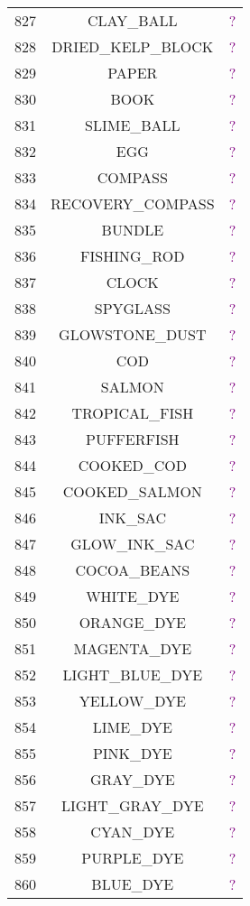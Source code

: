 \documentclass[11pt]{article}
\newcommand\myworries[1]{\textcolor{purple}{#1}}
\begin{document}
\begin{longtable}{ |c|c|c| }
	827 & CLAY\_BALL & \myworries{?} \\
	828 & DRIED\_KELP\_BLOCK & \myworries{?} \\
	829 & PAPER & \myworries{?} \\
	830 & BOOK & \myworries{?} \\
	831 & SLIME\_BALL & \myworries{?} \\
	832 & EGG & \myworries{?} \\
	833 & COMPASS & \myworries{?} \\
	834 & RECOVERY\_COMPASS & \myworries{?} \\
	835 & BUNDLE & \myworries{?} \\
	836 & FISHING\_ROD & \myworries{?} \\
	837 & CLOCK & \myworries{?} \\
	838 & SPYGLASS & \myworries{?} \\
	839 & GLOWSTONE\_DUST & \myworries{?} \\
	840 & COD & \myworries{?} \\
	841 & SALMON & \myworries{?} \\
	842 & TROPICAL\_FISH & \myworries{?} \\
	843 & PUFFERFISH & \myworries{?} \\
	844 & COOKED\_COD & \myworries{?} \\
	845 & COOKED\_SALMON & \myworries{?} \\
	846 & INK\_SAC & \myworries{?} \\
	847 & GLOW\_INK\_SAC & \myworries{?} \\
	848 & COCOA\_BEANS & \myworries{?} \\
	849 & WHITE\_DYE & \myworries{?} \\
	850 & ORANGE\_DYE & \myworries{?} \\
	851 & MAGENTA\_DYE & \myworries{?} \\
	852 & LIGHT\_BLUE\_DYE & \myworries{?} \\
	853 & YELLOW\_DYE & \myworries{?} \\
	854 & LIME\_DYE & \myworries{?} \\
	855 & PINK\_DYE & \myworries{?} \\
	856 & GRAY\_DYE & \myworries{?} \\
	857 & LIGHT\_GRAY\_DYE & \myworries{?} \\
	858 & CYAN\_DYE & \myworries{?} \\
	859 & PURPLE\_DYE & \myworries{?} \\
	860 & BLUE\_DYE & \myworries{?} \\

\end{longtable}
\end{document}
